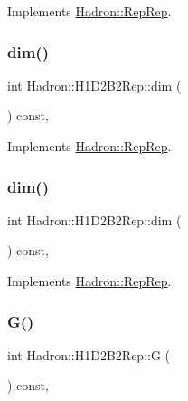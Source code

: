 Implements \mbox{\hyperlink{structHadron_1_1RepRep_a92c8802e5ed7afd7da43ccfd5b7cd92b}{Hadron\+::\+Rep\+Rep}}.

\mbox{\label{structHadron_1_1H1D2B2Rep_a85eefb2c84f92b80d516a6da91a49911}} 
\subsubsection{\texorpdfstring{dim()}{dim()}\hspace{0.1cm}{\footnotesize\ttfamily [2/3]}}
{\footnotesize\ttfamily int Hadron\+::\+H1\+D2\+B2\+Rep\+::dim (\begin{DoxyParamCaption}{ }\end{DoxyParamCaption}) const\hspace{0.3cm}{\ttfamily [inline]}, {\ttfamily [virtual]}}



Implements \mbox{\hyperlink{structHadron_1_1RepRep_a92c8802e5ed7afd7da43ccfd5b7cd92b}{Hadron\+::\+Rep\+Rep}}.

\mbox{\label{structHadron_1_1H1D2B2Rep_a85eefb2c84f92b80d516a6da91a49911}} 
\subsubsection{\texorpdfstring{dim()}{dim()}\hspace{0.1cm}{\footnotesize\ttfamily [3/3]}}
{\footnotesize\ttfamily int Hadron\+::\+H1\+D2\+B2\+Rep\+::dim (\begin{DoxyParamCaption}{ }\end{DoxyParamCaption}) const\hspace{0.3cm}{\ttfamily [inline]}, {\ttfamily [virtual]}}



Implements \mbox{\hyperlink{structHadron_1_1RepRep_a92c8802e5ed7afd7da43ccfd5b7cd92b}{Hadron\+::\+Rep\+Rep}}.

\mbox{\label{structHadron_1_1H1D2B2Rep_a8a24864ed3b1e7faee9eee169fc3470b}} 
\subsubsection{\texorpdfstring{G()}{G()}\hspace{0.1cm}{\footnotesize\ttfamily [1/2]}}
{\footnotesize\ttfamily int Hadron\+::\+H1\+D2\+B2\+Rep\+::G (\begin{DoxyParamCaption}{ }\end{DoxyParamCaption}) const\hspace{0.3cm}{\ttfamily [inline]}, {\ttfamily [virtual]}}

